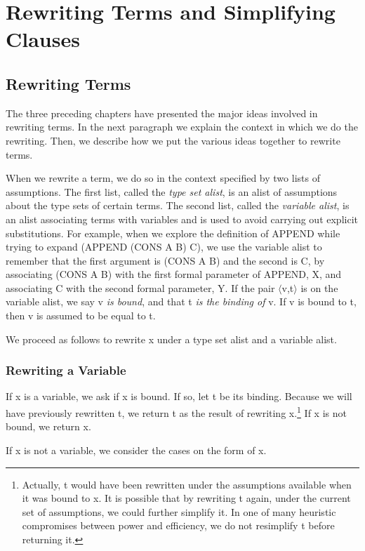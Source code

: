\documentclass[11pt]{book}
\newcommand{\pubinlineunderline}[1]{\emph{#1}}
\newcommand{\pubdefaulttextsize}{\large}
\begin{document}
\chapter{Rewriting Terms and Simplifying Clauses}
\label{SECREWRITESIMPLIFY}
\pubdefaulttextsize
\section{Rewriting Terms}
\pubdefaulttextsize
The three preceding chapters have presented the major ideas
involved in rewriting terms.  In the next paragraph we explain the
context in which we do the rewriting.  Then, we describe how we
put the various ideas together to rewrite terms.

When we rewrite a term, we do so in the context specified by two lists of
assumptions.  The first list, called the \pubinlineunderline{type set alist}, 
is an alist of assumptions about the type sets
of certain terms.  The second list,
called the \pubinlineunderline{variable alist}, is
an alist associating terms with variables
and is used to avoid carrying out explicit substitutions.  For example,
when we explore the definition of APPEND while trying to expand
(APPEND (CONS A B) C), we use the variable alist to remember that the first
argument is (CONS A B) and the second is C, by associating (CONS A B) with
the first formal parameter of APPEND, X, and associating C with the
second formal parameter, Y.  If the pair $\langle$v,t$\rangle$ is on the variable alist, we
say v \pubinlineunderline{is bound}, and that t \pubinlineunderline{is the binding of} v.
If v is bound to t, then v is assumed to be equal to t.

We proceed as follows to rewrite x under a type set alist and a variable alist.
\subsection{Rewriting a Variable}
\pubdefaulttextsize
If x is a variable, we ask if x is bound.
If so, let t be its binding.  Because we will have previously rewritten t,
we return t as the result of rewriting x.\footnote{Actually, t would have been rewritten under the assumptions available when it was bound to x.  It is possible that by rewriting t again, under the current set of assumptions, we could further simplify it.  In one of many heuristic compromises between power and efficiency, we do not resimplify t before returning it.}
If x is not bound, we return x.

If x is not a variable, we consider the cases on the form of x.
\end{document}
